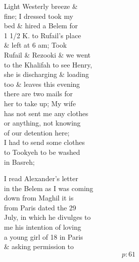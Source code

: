 \documentclass{report}
\begin{document}
	\par{
 	Light Westerly breeze \&\ \\fine; I dressed took my\ \\bed \& hired a Belem for\ \\1 1/2 K. to Rufail's place\ \\\& left at 6 am; Took\ \\Rufail \& Rezooki \& we went\ \\to the Khalifah to see Henry,\ \\she is discharging \& loading\ \\too \& leaves this evening\ \\there are two mails for\ \\her to take up; My wife\ \\has not sent me any clothes\ \\or anything, not knowing\ \\of our detention here;\ \\I had to send some clothes\ \\to Tookyeh to be washed\ \\in Basreh;\ \\
	}

	\par{
 	I read Alexander's letter\ \\in the Belem as I was coming\ \\down from Maghil it is\ \\from Paris dated the 29\ \\July, in which he divulges to\ \\me his intention of loving\ \\a young girl of 18 in Paris\ \\\& asking permission to\ \\
  \[p: 61 \]

	}


\end{document}
